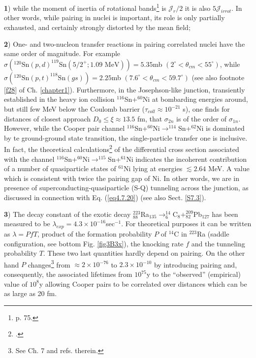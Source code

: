   \textbf{1}) while the moment of inertia of rotational bands\footnote{\cite{Bohr:75} p. 75.} is $\mathcal J_r/2$ it is also $5 \mathcal J_{irrot}$. In other words, while pairing in nuclei is important, its role is only partially exhausted, and certainly strongly distorted by the mean field; 
  
  \textbf{2}) One- and two-nucleon transfer reactions in pairing correlated nuclei have the same order of magnitude. For example $\sigma (^{120}\text{Sn}(p,d)^{119}\text{Sn}(5/2^+; 1.09 \text{ MeV}))=5.35 $mb $(2^\circ<\theta_{cm}<55^\circ)$, while $\sigma (^{120}\text{Sn}(p,t)^{118}\text{Sn}(gs))=2.25 $mb $(7.6^\circ<\theta_{cm}<59.7^\circ)$ (see also footnote \ref{f28} of  Ch. \ref{chapter1}). Furthermore, in the Josephson-like junction, transiently established in the heavy ion collision $^{116}$Sn+$^{60}$Ni at bombarding energies around, but still few MeV below the Coulomb barrier ($\tau_{coll}\approx10^{-21}$ s), one finds for distances of closest approach $D_0\leq\xi\approx13.5$ fm, that $\sigma_{2n}$ is of the order of $\sigma_{1n}$. However, while the Cooper pair channel $^{116}$Sn+$^{60}$Ni$\to^{114}$Sn+$^{62}$Ni is dominated by te ground-ground state transition, the single-particle transfer one is inclusive. In fact, the theoretical calculations\footnote{\cite{Montanari:14,Potel:20b}.} of the differential cross section  associated with the channel $^{116}$Sn+$^{60}$Ni$\to^{115}$Sn+$^{61}$Ni indicates the incoherent contribution of a number of quasiparticle states of $^{61}$Ni lying at energies $\lesssim2.64$ MeV. A value which is consistent with twice the pairing gap of Ni. In other words, we are in presence of superconducting-quasiparticle (S-Q) tunneling across the junction, as discussed in connection with Eq. (\ref{eq4.7.20}) (see also Sect. \ref{S7.3}).
  
  
   \textbf{3}) The decay constant of the exotic decay $^{223}_{88}$Ra$_{135}\rightarrow^{14}_6$C$_8+^{209}_{82}$Pb$_{127}$ has been measured to be $\lambda_{exp}=4.3\times10^{-16}$sec$^{-1}$. For theoretical purposes it can be written as $\lambda=PfT$, product of the formation probability $P$ of $^{14}$C in $^{223}$Ra (saddle configuration, see bottom Fig. \ref{fig3B3x}), the knocking rate $f$ and the tunneling probability $T$. These two last quantities hardly depend on pairing. On the other hand $P$ changes\footnote{See \cite{Brink:05} Ch. 7 and refs. therein.} from $\approx 2\times10^{-76}$ to $2.3\times10^{-10}$ by introducing pairing and, consequently, the associated lifetimes from $10^{75}$y to the ``observed'' (empirical) value of $10^8$y  allowing Cooper pairs to be correlated over distances which can be as large as 20 fm.
 
